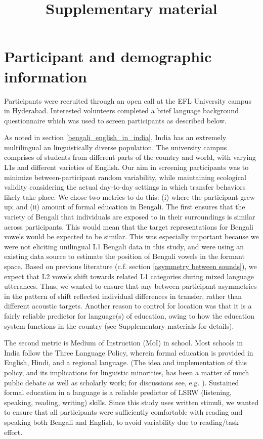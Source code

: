 \documentclass[12 pt]{article}
\title{Supplementary material}
\date{}
\begin{document}
	

\section*{Participant and demographic information}

Participants were recruited through an open call at the EFL University campus in Hyderabad. Interested volunteers completed a brief language background questionnaire which was used to screen participants as described below. 

As noted in section \ref{bengali_english_in_india}, India has an extremely multilingual an linguistically diverse population. The university campus comprises of students from different parts of the country and world, with varying L1s and different varieties of English. Our aim in screening participants was to minimize between-participant random variability, while maintaining ecological validity considering the actual day-to-day settings in which transfer behaviors likely take place. We chose two metrics to do this: (i) where the participant grew up; and (ii) amount of formal education in Bengali. The first ensures that the variety of Bengali that individuals are exposed to in their surroundings is similar across participants. This would mean that the target representations for Bengali vowels would be expected to be similar. This was especially important because we were not eliciting unilingual L1 Bengali data in this study, and were using an existing data source to estimate the position of Bengali vowels in the formant space. Based on previous literature (c.f. section \ref{asymmetry between sounds}), we expect that L2 vowels shift towards related L1 categories during mixed language utterances. Thus, we wanted to ensure that any between-participant asymmetries in the pattern of shift reflected individual differences in transfer, rather than different acoustic targets. Another reason to control for location was that it is a fairly reliable predictor for language(s) of education, owing to how the education system functions in the country (see Supplementary materials for details).

The second metric is Medium of Instruction (MoI) in school. Most schools in India follow the Three Language Policy, wherein formal education is provided in English, Hindi, and a regional language. \alert{(The idea and implementation of this policy, and its implications for linguistic minorities, has been a matter of much public debate as well as scholarly work; for discussions see, e.g. \cite{tollefson2014language, jhingran2009hundreds, khubchandani1997language, mohanty2009multilingual, ramanathan2005rethinking}).} Sustained formal education in a language is a reliable predictor of LSRW (listening, speaking, reading, writing) skills. Since this study uses written stimuli, we wanted to ensure that all participants were sufficiently comfortable with reading and speaking both Bengali and English, to avoid variability due to reading/task effort.  
\end{document}
